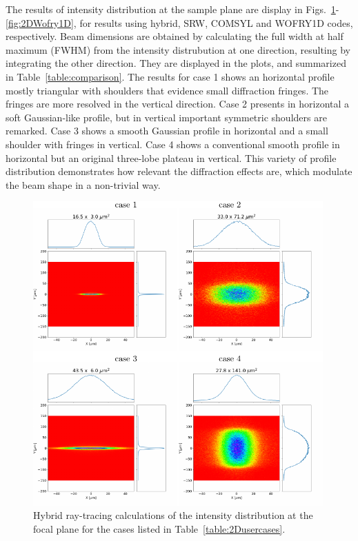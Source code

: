 \documentclass{iucr}              %
\begin{document}
The results of intensity distribution at the sample plane are display in Figs.~\ref{fig:hybrid}-\ref{fig:2DWofry1D}, for results using hybrid, SRW, COMSYL and WOFRY1D codes, respectively.  Beam dimensions are obtained by calculating the full width at half maximum (FWHM) from the intensity distrubution at one direction, resulting by integrating the other direction. They are displayed in the plots, and summarized in Table~\ref{table:comparison}.
The results for case 1 shows an horizontal profile mostly triangular with shoulders that evidence small diffraction fringes. The fringes are more resolved in the vertical direction. Case 2  presents in horizontal a soft Gaussian-like profile, but in vertical important symmetric shoulders are remarked. Case 3 shows a smooth Gaussian profile in horizontal and a small shoulder with fringes in vertical. Case 4 shows a conventional smooth profile in horizontal but an original three-lobe plateau in vertical. This variety of profile distribution demonstrates how relevant the diffraction effects are, which modulate the beam shape in a non-trivial way.  

\newpage

\begin{figure}
    \label{fig:hybrid}
    \includegraphics[width=0.99\textwidth]{figures/fig_hybrid.pdf}
    \caption{Hybrid ray-tracing calculations of the intensity distribution at the focal plane for the cases listed in Table~\ref{table:2Dusercases}.}
\end{figure}
\end{document}

